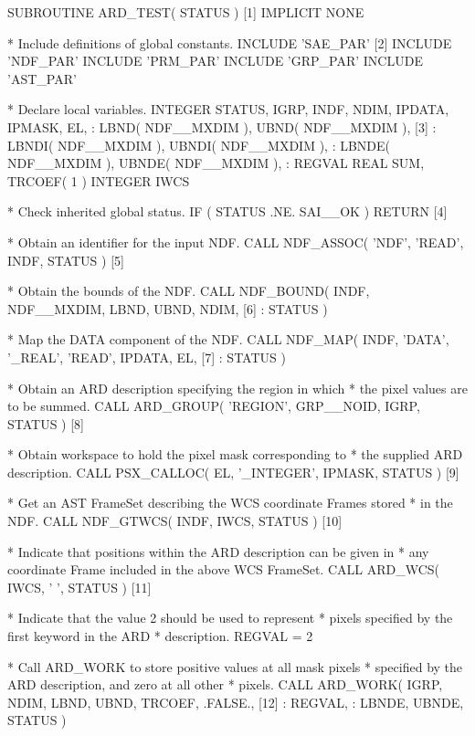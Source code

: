 \documentclass[11pt,nolof]{starlink}
\begin{document}
\small
\begin{terminalv}
      SUBROUTINE ARD_TEST( STATUS )                             [1]
      IMPLICIT NONE

*  Include definitions of global constants.
      INCLUDE 'SAE_PAR'                                         [2]
      INCLUDE 'NDF_PAR'
      INCLUDE 'PRM_PAR'
      INCLUDE 'GRP_PAR'
      INCLUDE 'AST_PAR'

*  Declare local variables.
      INTEGER STATUS, IGRP, INDF, NDIM, IPDATA, IPMASK, EL,
     :        LBND( NDF__MXDIM ), UBND( NDF__MXDIM ),           [3]
     :        LBNDI( NDF__MXDIM ), UBNDI( NDF__MXDIM ),
     :        LBNDE( NDF__MXDIM ), UBNDE( NDF__MXDIM ),
     :        REGVAL
      REAL SUM, TRCOEF( 1 )
      INTEGER IWCS

*  Check inherited global status.
      IF ( STATUS .NE. SAI__OK ) RETURN                         [4]

*  Obtain an identifier for the input NDF.
      CALL NDF_ASSOC( 'NDF', 'READ', INDF, STATUS )             [5]

*  Obtain the bounds of the NDF.
      CALL NDF_BOUND( INDF, NDF__MXDIM, LBND, UBND, NDIM,       [6]
     :                STATUS )

*  Map the DATA component of the NDF.
      CALL NDF_MAP( INDF, 'DATA', '_REAL', 'READ', IPDATA, EL,  [7]
     :              STATUS )

*  Obtain an ARD description specifying the region in which
*  the pixel values are to be summed.
      CALL ARD_GROUP( 'REGION', GRP__NOID, IGRP, STATUS )       [8]

*  Obtain workspace to hold the pixel mask corresponding to
*  the supplied ARD description.
      CALL PSX_CALLOC( EL, '_INTEGER', IPMASK, STATUS )         [9]

*  Get an AST FrameSet describing the WCS coordinate Frames stored
*  in the NDF.
      CALL NDF_GTWCS( INDF, IWCS, STATUS )                      [10]

*  Indicate that positions within the ARD description can be given in
*  any coordinate Frame included in the above WCS FrameSet.
      CALL ARD_WCS( IWCS, ' ', STATUS )                              [11]

*  Indicate that the value 2 should be used to represent
*  pixels specified by the first keyword in the ARD
*  description.
      REGVAL = 2

*  Call ARD_WORK to store positive values at all mask pixels
*  specified by the ARD description, and zero at all other
*  pixels.
      CALL ARD_WORK( IGRP, NDIM, LBND, UBND, TRCOEF, .FALSE.,   [12]
     :               REGVAL, %
     :               LBNDE,  UBNDE, STATUS )


\end{terminalv}
\end{document}
